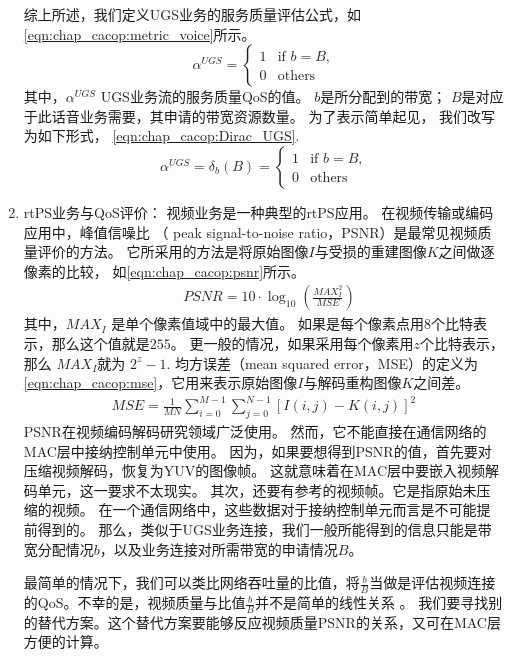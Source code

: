 \begin{enumerate}[(1)]
综上所述，我们定义UGS业务的服务质量评估公式，如\eqref{eqn:chap_cacop:metric_voice}所示。
\begin{equation}
\label{eqn:chap_cacop:metric_voice}
\alpha^{UGS}=
\begin{cases}
1 & \text{if $b=B$,}\\
0 &\text{others}
\end{cases}
\end{equation}
其中，$\alpha^{UGS}$ UGS业务流的服务质量QoS的值。
$b$是所分配到的带宽；
$B$是对应于此话音业务需要，其申请的带宽资源数量。
为了表示简单起见，
我们改写为如下形式，
\eqref{eqn:chap_cacop:Dirac_UGS}.
%
\begin{equation}
\label{eqn:chap_cacop:Dirac_UGS}
\alpha^{UGS}= \delta_{b}(B) = 
\begin{cases}
1 & \text{if $b= B$,}\\
0 &\text{others}
\end{cases}
\end{equation}
\item rtPS业务与QoS评价： 
视频业务是一种典型的rtPS应用。
在视频传输或编码应用中，峰值信噪比 （ peak signal-to-noise ratio，PSNR）是最常见视频质量评价的方法。
它所采用的方法是将原始图像$I$与受损的重建图像$K$之间做逐像素的比较，
如\eqref{eqn:chap_cacop:psnr}所示。 
%
\begin{align}
\label{eqn:chap_cacop:psnr}
& PSNR = 10 \cdot \log_{10} \left( \frac{MAX_I^2}{MSE} \right)
\end{align}
其中，$MAX_I$ 是单个像素值域中的最大值。
如果是每个像素点用$8$个比特表示，那么这个值就是$255$。
更一般的情况，如果采用每个像素用$z$个比特表示，那么 $MAX_I$就为 $2^z - 1$. 均方误差（mean squared error，MSE）的定义为\eqref{eqn:chap_cacop:mse}，它用来表示原始图像$I$与解码重构图像$K$之间差。
\begin{align}
\label{eqn:chap_cacop:mse}
MSE = \frac{1}{MN} \sum_{i=0}^{M-1}\sum_{j=0}^{N-1} \left[I(i,j) - K(i,j)\right]^2 
\end{align}
PSNR在视频编码解码研究领域广泛使用。
然而，它不能直接在通信网络的MAC层中接纳控制单元中使用。
因为，如果要想得到PSNR的值，首先要对压缩视频解码，恢复为YUV的图像帧。
这就意味着在MAC层中要嵌入视频解码单元，这一要求不太现实。
其次，还要有参考的视频帧。它是指原始未压缩的视频。
在一个通信网络中，这些数据对于接纳控制单元而言是不可能提前得到的。
那么，类似于UGS业务连接，我们一般所能得到的信息只能是带宽分配情况$b$，以及业务连接对所需带宽的申请情况$B$。

最简单的情况下，我们可以类比网络吞吐量的比值，将$\frac{b}{B}$当做是评估视频连接的QoS。不幸的是，视频质量与比值$\frac{b}{B}$并不是简单的线性关系
 \cite{He1013856}。
我们要寻找别的替代方案。这个替代方案要能够反应视频质量PSNR的关系，又可在MAC层方便的计算。


\end{enumerate}


